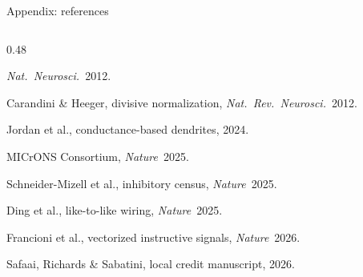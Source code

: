 \begin{frame}{Appendix: references}
\begin{columns}[T,onlytextwidth]
\begin{column}{0.48\textwidth}
{         \emph{Nat.~Neurosci.}~2012.\par
       Carandini \& Heeger, divisive normalization,
         \emph{Nat.~Rev.~Neurosci.}~2012.\par
       Jordan et al., conductance-based dendrites, 2024.\par
       MICrONS Consortium, \emph{Nature}~2025.\par
       Schneider-Mizell et al., inhibitory census, \emph{Nature}~2025.\par
       Ding et al., like-to-like wiring, \emph{Nature}~2025.\par
       Francioni et al., vectorized instructive signals,
         \emph{Nature}~2026.\par
       Safaai, Richards \& Sabatini, local credit manuscript, 2026.\par}
    \end{column}
  \end{columns}
  \vfill
  \vspace{0.04cm}
\end{frame}

\iffalse

